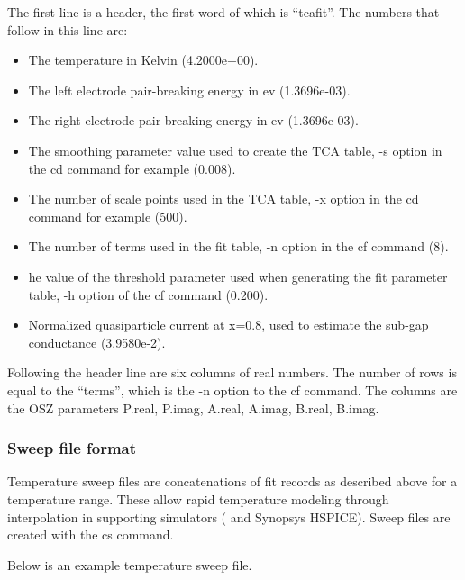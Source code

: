 {The first line is a header, the first word of which is ``{\vt tcafit}''.
The numbers that follow in this line are:

\begin{itemize}
\item{The temperature in Kelvin (4.2000e+00).}
\item{The left electrode pair-breaking energy in ev (1.3696e-03).}
\item{The right electrode pair-breaking energy in ev (1.3696e-03).}
\item{The smoothing parameter value used to create the TCA table, {\vt
-s} option in the {\vt cd} command for example (0.008).}
\item{The number of scale points used in the TCA table, {\vt -x}
option in the {\vt cd} command for example (500).}
\item{The number of terms used in the fit table, {\vt -n} option in
the {\vt cf} command (8).}
\item{he value of the threshold parameter used when generating the fit
parameter table, {\vt -h} option of the {\vt cf} command (0.200).}
\item{Normalized quasiparticle current at x=0.8, used to estimate the
sub-gap conductance (3.9580e-2).}
\end{itemize}

Following the header line are six columns of real numbers.  The number
of rows is equal to the ``terms'', which is the {\vt -n} option to the
{\vt cf} command.  The columns are the OSZ parameters P.real, P.imag,
A.real, A.imag, B.real, B.imag.

\subsubsection{Sweep file format}

Temperature sweep files are concatenations of fit records as described
above for a temperature range.  These allow rapid temperature modeling
through interpolation in supporting simulators ({\WRspice} and
Synopsys HSPICE).  Sweep files are created with the {\vt cs} command.

Below is an example temperature sweep file.

}

